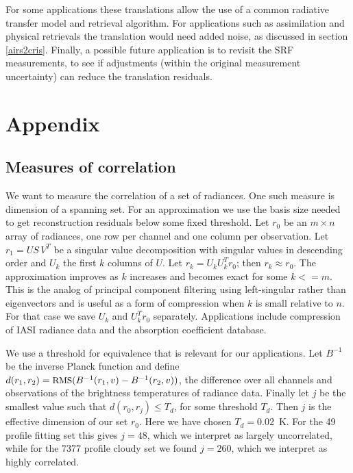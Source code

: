 \documentclass[journal]{IEEEtran}
\begin{document}
For some applications these translations allow the use of a common
radiative transfer model and retrieval algorithm.  For applications
such as assimilation and physical retrievals the translation would
need added noise, as discussed in section \ref{airs2cris}.  Finally,
a possible future application is to revisit the {\airs} SRF
measurements, to see if adjustments (within the original measurement
uncertainty) can reduce the translation residuals.


\section{Appendix}
\label{append}

\subsection{Measures of correlation}

We want to measure the correlation of a set of radiances.  One such
measure is dimension of a spanning set.  For an approximation we use
the basis size needed to get reconstruction residuals below some
fixed threshold.  Let $r_0$ be an $m \times n$ array of radiances,
one row per channel and one column per observation.  Let $r_1 = U
S\,V^T$ be a singular value decomposition with singular values in
descending order and $U_k$ the first $k$ columns of $U$.  Let $r_k =
U_k U_k^T r_0$; then $r_k \approx r_0$.  The approximation improves
as $k$ increases and becomes exact for some $k <= m$.  This is the
analog of principal component filtering using left-singular rather
than eigenvectors and is useful as a form of compression when $k$ is
small relative to $n$.  For that case we save $U_k$ and $U_k^T r_0$
separately.  Applications include compression of IASI radiance data
and the {\kcarta} absorption coefficient database.

We use a threshold for equivalence that is relevant for our
applications.  Let $B^{-1}$ be the inverse Planck function and
define $d(r_1, r_2) = \mbox{\small RMS}(B^{-1}(r_1, v) - B^{-1}(r_2, v))$, the
{\rms} difference over all channels and observations of the
brightness temperatures of radiance data.  Finally let $j$ be the
smallest value such that $d(r_0, r_j) \le T_d$, for some threshold
$T_d$.  Then $j$ is the effective dimension of our set $r_0$.  Here
we have chosen $T_d = 0.02$~K.  For the 49 profile fitting set this
gives $j=48$, which we interpret as largely uncorrelated, while for
the 7377 profile cloudy set we found $j=260$, which we interpret as
highly correlated.
\end{document}
